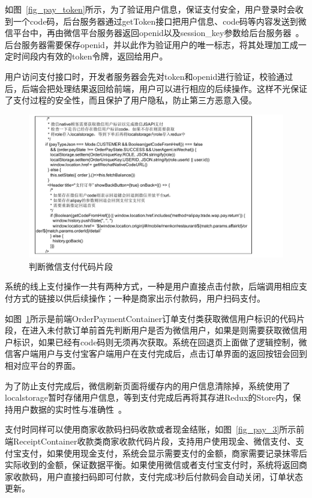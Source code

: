 如图~\ref{fig_pay_token}所示，为了验证用户信息，保证支付安全，用户登录时会收到一个code码，后台服务器通过getToken接口把用户信息、code码等内容发送到微信平台中，再由微信平台服务器返回openid以及session\_key参数给后台服务器~\cite{lby2019}。
后台服务器需要保存openid，并以此作为验证用户的唯一标志，将其处理加工成一定时间段内有效的token令牌，返回给用户。

用户访问支付接口时，开发者服务器会先对token和openid进行验证，校验通过后，后端会把处理结果返回给前端，用户可以进行相应的后续操作。这样不光保证了支付过程的安全性，而且保护了用户隐私，防止第三方恶意入侵。

\begin{figure}[htbp!]
    \centering
    \includegraphics[width=\linewidth]{FIGs/chapter4/2.pdf}
    \caption{判断微信支付代码片段}\label{fig_pay_2}
\end{figure}

系统的线上支付操作一共有两种方式，一种是用户直接点击付款，后端调用相应支付方式的链接以供后续操作；一种是商家出示付款码，用户扫码支付。

如图~\ref{fig_pay_2}所示是前端OrderPaymentContainer订单支付类获取微信用户标识的代码片段，在进入未付款订单前首先判断用户是否为微信用户，如果是则需要获取微信用户标识，如果已经有code码则无须再次获取。系统在回退页上面做了逻辑控制，微信客户端用户与支付宝客户端用户在支付完成后，点击订单界面的返回按钮会回到相对应平台的界面。

为了防止支付完成后，微信刷新页面将缓存内的用户信息清除掉，系统使用了localstorage暂时存储用户信息，等到支付完成后再将其存进Redux的Store内，保持用户数据的实时性与准确性~\cite{mys2019}。

支付时同样可以使用商家收款码扫码收款或者现金结账，如图~\ref{fig_pay_3}所示前端ReceiptContainer收款类商家收款代码片段，支持用户使用现金、微信支付、支付宝支付，如果使用现金支付，系统会显示需要支付的金额，商家需要记录抹零后实际收到的金额，保证数据平衡。如果使用微信或者支付宝支付时，系统将返回商家收款码，用户直接扫码即可付款，支付完成3秒后付款码会自动关闭，订单状态更新。\\

